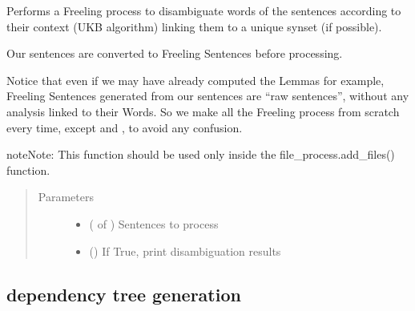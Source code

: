 \documentclass[letterpaper,10pt,english]{sphinxmanual}
\begin{document}
\begin{fulllineitems}
\label{\detokenize{process:loacore.process.synset_process.add_synsets_to_sentences}}
Performs a Freeling process to disambiguate words of the sentences according to their context
(UKB algorithm) linking them to a unique synset (if possible).

Our sentences are converted to Freeling Sentences before processing.

Notice that even if we may have already computed the Lemmas for example, Freeling Sentences generated from our
sentences are “raw sentences”, without any analysis linked to their Words. So we make all the Freeling
process from scratch every time, except  and , to avoid any confusion.

\begin{sphinxadmonition}{note}{Note:}
This function should be used only inside the file\_process.add\_files() function.
\end{sphinxadmonition}
\begin{quote}\begin{description}
\item[{Parameters}] \leavevmode\begin{itemize}
\item {} 
 ( of {\hyperref[\detokenize{classes:loacore.classes.classes.Sentence}]{}}) \textendash{} Sentences to process

\item {} 
 () \textendash{} If True, print disambiguation results

\end{itemize}

\end{description}\end{quote}

\end{fulllineitems}



\subsection{dependency tree generation}
\label{\detokenize{process:module-loacore.process.deptree_process}}\label{\detokenize{process:dependency-tree-generation}}
\end{document}
